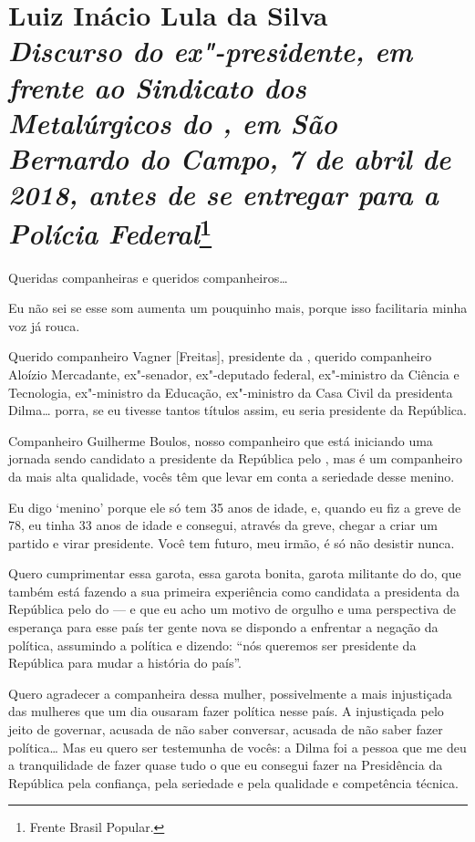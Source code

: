 \chapter*{Luiz Inácio Lula da Silva\\
\emph{\large{Discurso do ex"-presidente, em frente ao
Sindicato dos Metalúrgicos do , em São Bernardo do Campo, 7 de abril de 2018, antes de se entregar para a Polícia Federal}}\footnote{Frente Brasil Popular.}}


Queridas companheiras e queridos companheiros\ldots{}

Eu não sei se esse som aumenta um pouquinho mais, porque isso
facilitaria minha voz já rouca.

Querido companheiro Vagner [Freitas], presidente da ,
querido companheiro Aloízio Mercadante, ex"-senador, ex"-deputado federal,
ex"-ministro da Ciência e Tecnologia, ex"-ministro da Educação,
ex"-ministro da Casa Civil da presidenta Dilma\ldots{} porra, se eu tivesse
tantos títulos assim, eu seria presidente da República.

Companheiro Guilherme Boulos, nosso companheiro que está iniciando
uma jornada sendo candidato a presidente da República pelo , mas é
um companheiro da mais alta qualidade, vocês têm que levar em conta
a seriedade desse menino.

Eu digo `menino' porque ele só tem 35 anos de idade, e, quando eu
fiz a greve de 78, eu tinha 33 anos de idade e consegui, através da
greve, chegar a criar um partido e virar presidente. Você tem futuro,
meu irmão, é só não desistir nunca.

Quero cumprimentar essa garota, essa garota bonita, garota
militante do do, que também está fazendo a sua primeira experiência
como candidata a presidenta da República pelo do --- e que eu acho
um motivo de orgulho e uma perspectiva de esperança para esse país ter
gente nova se dispondo a enfrentar a negação da política, assumindo a
política e dizendo: ``nós queremos ser presidente da República para mudar
a história do país''.

Quero agradecer a companheira dessa mulher, possivelmente a mais
injustiçada das mulheres que um dia ousaram fazer política nesse país. A
injustiçada pelo jeito de governar, acusada de não saber conversar,
acusada de não saber fazer política\ldots{} Mas eu quero ser testemunha de
vocês: a Dilma foi a pessoa que me deu a tranquilidade de fazer quase
tudo o que eu consegui fazer na Presidência da República pela confiança,
pela seriedade e pela qualidade e competência técnica.

